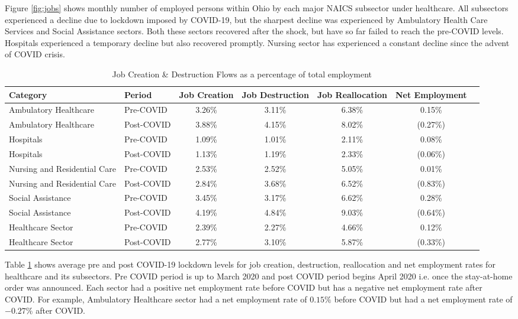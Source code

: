 \documentclass[11pt]{article}
\begin{document}
Figure \ref{fig:jobs} shows monthly number of employed persons within Ohio by each major NAICS subsector under healthcare. All subsectors experienced a decline due to lockdown imposed by COVID-19, but the sharpest decline was experienced by Ambulatory Health Care Services and Social Assistance sectors. Both these sectors recovered after the shock, but have so far failed to reach the pre-COVID levels. Hospitals experienced a temporary decline but also recovered promptly. Nursing sector has experienced a constant decline since the advent of COVID crisis.

\vskip 0.5cm

\begin{table}[h]
\caption{Job Creation \& Destruction Flows as a percentage of total employment}
\resizebox{\textwidth}{!}
{
\begin{tabular}{llccccc}
\hline
\rowcolor[HTML]{C0C0C0} 
Category & Period & Job Creation & Job Destruction & Job Reallocation & Net Employment  \\ \hline
Ambulatory Healthcare & Pre-COVID & 3.26\% & 3.11\% & 6.38\% & 0.15\%  \\ \hline
Ambulatory Healthcare & Post-COVID & 3.88\% & 4.15\% & 8.02\% & (0.27\%) \\ \hline
Hospitals & Pre-COVID & 1.09\% & 1.01\% & 2.11\% & 0.08\% \\ \hline
Hospitals & Post-COVID & 1.13\% & 1.19\% & 2.33\% & (0.06\%) \\ \hline
Nursing and Residential Care & Pre-COVID & 2.53\% & 2.52\% & 5.05\% & 0.01\% \\ \hline
Nursing and Residential Care & Post-COVID & 2.84\% & 3.68\% & 6.52\% & (0.83\%) \\ \hline
Social Assistance & Pre-COVID & 3.45\% & 3.17\% & 6.62\% & 0.28\% \\ \hline
Social Assistance & Post-COVID & 4.19\% & 4.84\% & 9.03\% & (0.64\%) \\ \hline
Healthcare Sector & Pre-COVID & 2.39\% & 2.27\% & 4.66\% & 0.12\% \\ \hline
Healthcare Sector & Post-COVID & 2.77\% & 3.10\% & 5.87\% & (0.33\%) \\ \hline
\end{tabular}
}
\label{table:ohphscovid}
\end{table}
\vskip 0.2cm
Table \ref{table:ohphscovid} shows average pre and post COVID-19 lockdown levels for job creation, destruction, reallocation and net employment rates for healthcare and its subsectors. Pre COVID period is up to March 2020 and post COVID period begins April 2020 i.e. once the stay-at-home order was announced. 
Each sector had a positive net employment rate before COVID but has a negative net employment rate after COVID. For example, Ambulatory Healthcare sector had a net employment rate of $0.15\%$ before COVID but had a net employment rate of $-0.27\%$ after COVID.
\end{document}
